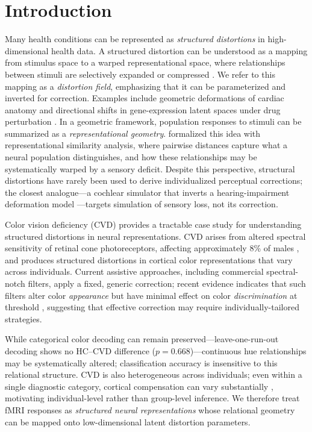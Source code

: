 \documentclass{article}
\begin{document}
\section{Introduction}
\label{sec:intro}

Many health conditions can be represented as \emph{structured distortions} in high-dimensional health data. 
A structured distortion can be understood as a mapping from stimulus space to a warped representational space, where relationships between stimuli are selectively expanded or compressed \citep{kriegeskorte2008}. We refer to this mapping as a \emph{distortion field}, emphasizing that it can be parameterized and inverted for correction.
Examples include geometric deformations of cardiac anatomy \citep{biffi2020} and directional shifts in gene-expression latent spaces under drug perturbation \citep{lotfollahi2019}.
In a geometric framework, population responses to stimuli can be summarized as a \emph{representational geometry}.
\citet{kriegeskorte2008} formalized this idea with representational similarity analysis, where pairwise distances capture what a neural population distinguishes, and how these relationships may be systematically warped by a sensory deficit. 
Despite this perspective, structural distortions have rarely been used to derive individualized perceptual corrections; the closest analogue---a cochlear simulator that inverts a hearing-impairment deformation model \citep{irino2023}---targets simulation of sensory loss, not its correction.

Color vision deficiency (CVD) provides a tractable case study for understanding structured distortions in neural representations.
CVD arises from altered spectral sensitivity of retinal cone photoreceptors, affecting approximately 8\% of males \citep{machado2009}, and produces structured distortions in cortical color representations that vary across individuals.
Current assistive approaches, including commercial spectral-notch filters, apply a fixed, generic correction; recent evidence indicates that such filters alter color \emph{appearance} but have minimal effect on color \emph{discrimination} at threshold \citep{somers2024}, suggesting that effective correction may require individually-tailored strategies.

While categorical color decoding can remain preserved---leave-one-run-out decoding shows no HC--CVD difference ($p = 0.668$)---continuous hue relationships may be systematically altered; classification accuracy is insensitive to this relational structure.
CVD is also heterogeneous across individuals; even within a single diagnostic category, cortical compensation can vary substantially \citep{tregillus2021}, motivating individual-level rather than group-level inference.
We therefore treat fMRI responses as \emph{structured neural representations} whose relational geometry can be mapped onto low-dimensional latent distortion parameters.
\end{document}
